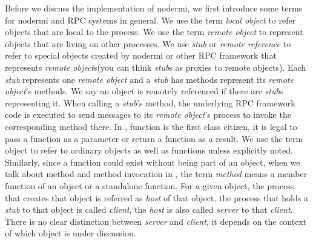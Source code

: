 Before we discuss the implementation of nodermi,
we first introduce some terms for nodermi and 
RPC systems in general.
We use the term \emph{local object}
to refer objects that are local to the process.
We use the term \emph{remote object} to represent objects that are
living on other processes.
We use \emph{stub} or \emph{remote reference} to refer to special objects created
by nodermi or other RPC framework that
represents \emph{remote object}s(you can think \emph{stub}s as proxies to remote objects).
Each \emph{stub} represents one \emph{remote object}
and a \emph{stub} has methods represent
its \emph{remote object}'s methods.
We say an object is remotely referenced if there are \emph{stub}s representing 
it. 
When calling a \emph{stub}'s method, the underlying
RPC framework code is executed to send messages
to its \emph{remote object}'s process
to invoke the corresponding method there.
In \js{}, function is the first class citizen, it is legal
to pass a function as a parameter or return a function as a result.
We use the term object to refer to ordinary objects as well as
functions unless explicitly noted.
Similarly, since a function could exist without being part of an object,
when we talk about method and method invocation in \js, 
the term \emph{method} means a member function of an object
or a standalone function.
For a given object, the process that creates that object is referred
as \emph{host} of that object,
the process that holds a \emph{stub} to that object is called \emph{client},
the \emph{host} is also called \emph{server} to that \emph{client}.
There is no clear distinction between \emph{server} and \emph{client},
it depends on the context of which object is under discussion.

\nodermiexamplefig{}

